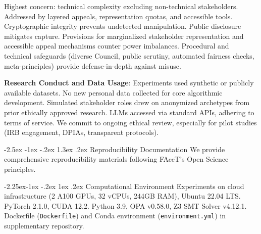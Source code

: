 \documentclass[manuscript,screen,9pt]{acmart}
\makeatletter
\renewcommand\section{\@startsection{section}{1}{\z@}%
  {-2.5ex \@plus -1ex \@minus -.2ex}%
  {1.3ex \@plus.2ex}%
  {\normalfont\Large\bfseries}}
\renewcommand\subsection{\@startsection{subsection}{2}{\z@}%
  {-2.25ex\@plus -1ex \@minus -.2ex}%
  {1ex \@plus .2ex}%
  {\normalfont\large\bfseries}}
\makeatother
\begin{document}
\begin{table}[htbp]
\begin{tabularx}{\linewidth}{@{} >{\raggedright}p{2.2cm} >{\centering\arraybackslash}p{1.6cm} >{\centering\arraybackslash}p{1.4cm} >{\centering\arraybackslash}p{2.0cm} >{\raggedright\arraybackslash}X @{}}
		\bottomrule
	\end{tabularx}
\end{table}
Highest concern: technical complexity excluding non-technical stakeholders. Addressed by layered appeals, representation quotas, and accessible tools. Cryptographic integrity prevents undetected manipulation. Public disclosure mitigates capture. Provisions for marginalized stakeholder representation and accessible appeal mechanisms counter power imbalances. Procedural and technical safeguards (diverse Council, public scrutiny, automated fairness checks, meta-principles) provide defense-in-depth against misuse.

\textbf{Research Conduct and Data Usage}:
Experiments used synthetic or publicly available datasets. No new personal data collected for core algorithmic development. Simulated stakeholder roles drew on anonymized archetypes from prior ethically approved research. LLMs accessed via standard APIs, adhering to terms of service. We commit to ongoing ethical review, especially for pilot studies (IRB engagement, DPIAs, transparent protocols).

\section{Reproducibility Documentation}
\label{app:reproducibility}
We provide comprehensive reproducibility materials following FAccT's Open Science principles.

\subsection{Computational Environment}
Experiments on cloud infrastructure (2 A100 GPUs, 32 vCPUs, 244GB RAM), Ubuntu 22.04 LTS. PyTorch 2.1.0, CUDA 12.2. Python 3.9, OPA v0.58.0, Z3 SMT Solver v4.12.1. Dockerfile (\texttt{Dockerfile}) and Conda environment (\texttt{environment.yml}) in supplementary repository.
\end{document}
